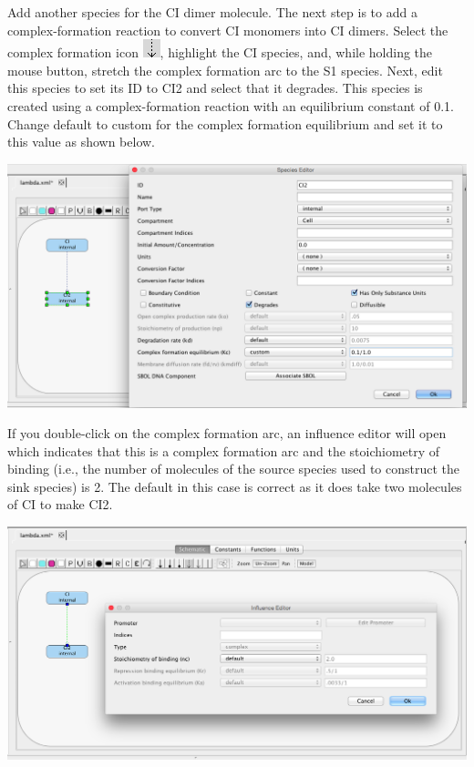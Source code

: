 \documentclass[titlepage,11pt]{article}
\begin{document}
Add another species for the CI dimer molecule.  The next step is to add a complex-formation reaction to convert CI monomers into CI dimers.  Select the complex formation icon \includegraphics{../gui/icons/modelview/bio_activation_selected}, highlight the CI species, and, while holding the mouse button, stretch the complex formation arc to the S1 species.  Next, edit this species to set its ID to CI2 and select that it degrades.  This species is created using a complex-formation reaction with an equilibrium constant of 0.1.  Change default to custom for the complex formation equilibrium and set it to this value as shown below.

\begin{center}
\includegraphics[width=160mm]{screenshots/species2} 
\end{center}

If you double-click on the complex formation arc, an influence editor will open which indicates that this is a complex formation arc and the stoichiometry of binding (i.e., the number of molecules of the source species used to construct the sink species) is 2.  The default in this case is correct as it does take two molecules of CI to make CI2.

\begin{center}
\includegraphics[width=160mm]{screenshots/complex} 
\end{center}
\end{document}
